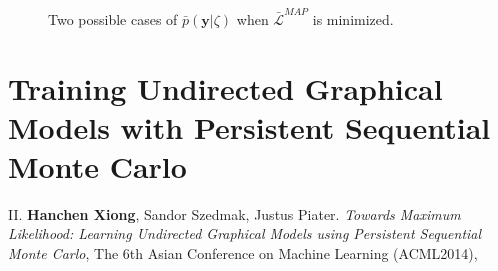 \begin{figure}[t]
    \centering
    \caption{Two possible cases of $\bar{p}(\mathbf{y}|\zeta)$ when $\bar{\mathcal{L}}^{MAP}$ is minimized.  } 
    \label{fig:MAP_outputs}
\end{figure}


\section{Training Undirected Graphical Models with Persistent Sequential Monte Carlo}

\begin{shaded}
{\Huge II.} \textbf{Hanchen Xiong}, Sandor Szedmak, Justus Piater. {\it Towards Maximum Likelihood: Learning Undirected Graphical Models using Persistent Sequential Monte Carlo}, The 6th Asian Conference on Machine Learning (ACML2014), 
\end{shaded}


